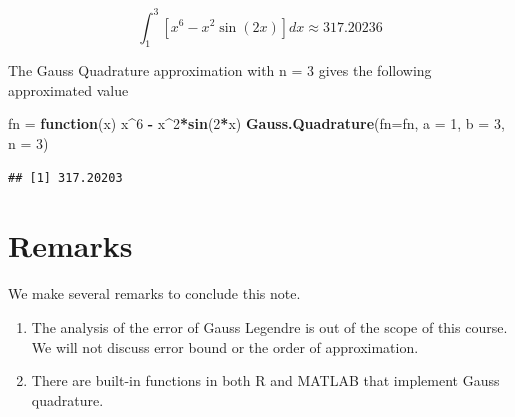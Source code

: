 \documentclass[
]{book}
\newenvironment{Shaded}{\begin{snugshade}}{\end{snugshade}}
\newcommand{\AttributeTok}[1]{\textcolor[rgb]{0.13,0.29,0.53}{#1}}
\newcommand{\ControlFlowTok}[1]{\textcolor[rgb]{0.13,0.29,0.53}{\textbf{#1}}}
\newcommand{\DecValTok}[1]{\textcolor[rgb]{0.00,0.00,0.81}{#1}}
\newcommand{\FunctionTok}[1]{\textcolor[rgb]{0.13,0.29,0.53}{\textbf{#1}}}
\newcommand{\NormalTok}[1]{#1}
\newcommand{\OtherTok}[1]{\textcolor[rgb]{0.56,0.35,0.01}{#1}}
\newcommand{\SpecialCharTok}[1]{\textcolor[rgb]{0.81,0.36,0.00}{\textbf{#1}}}
\begin{document}
\[
\int_1^3 [x^6 - x^2\sin(2x)]dx \approx 317.20236
\]

The Gauss Quadrature approximation with n = 3 gives the following approximated value

\begin{Shaded}
\begin{Highlighting}[]
\NormalTok{fn }\OtherTok{=} \ControlFlowTok{function}\NormalTok{(x) x}\SpecialCharTok{\^{}}\DecValTok{6} \SpecialCharTok{{-}}\NormalTok{ x}\SpecialCharTok{\^{}}\DecValTok{2}\SpecialCharTok{*}\FunctionTok{sin}\NormalTok{(}\DecValTok{2}\SpecialCharTok{*}\NormalTok{x)}
\FunctionTok{Gauss.Quadrature}\NormalTok{(}\AttributeTok{fn=}\NormalTok{fn, }\AttributeTok{a =} \DecValTok{1}\NormalTok{, }\AttributeTok{b =} \DecValTok{3}\NormalTok{, }\AttributeTok{n =} \DecValTok{3}\NormalTok{)}
\end{Highlighting}
\end{Shaded}

\begin{verbatim}
## [1] 317.20203
\end{verbatim}

\hypertarget{remarks}{%
\section{Remarks}\label{remarks}}

We make several remarks to conclude this note.

\begin{enumerate}
\def\labelenumi{\arabic{enumi}.}
\item
  The analysis of the error of Gauss Legendre is out of the scope of this course. We will not discuss error bound or the order of approximation.
\item
  There are built-in functions in both R and MATLAB that implement Gauss quadrature.
\end{enumerate}

  
\end{document}
